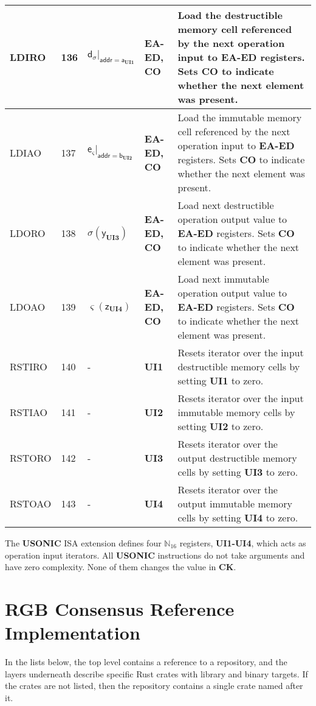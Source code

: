 \documentclass[9pt,oneside]{amsart}
\begin{document}
\begin{table}[h]
\begin{tabular}{l p{1cm} l p{1.5cm} p{9.3cm}}
LDIRO	&136	&$\mathsf{d}_\sigma|_{\mathsf{addr} = \mathsf{a}_\mathbf{UI1}}$	&\textbf{EA-ED, CO}	&Load the destructible memory cell referenced by the next operation input to \textbf{EA-ED} registers. Sets \textbf{CO} to indicate whether the next element was present. \\ \midrule
LDIAO	&137	&$\mathsf{e}_\varsigma|_{\mathsf{addr} = \mathsf{b}_\mathbf{UI2}}$	&\textbf{EA-ED, CO}	&Load the immutable memory cell referenced by the next operation input to \textbf{EA-ED} registers. Sets \textbf{CO} to indicate whether the next element was present. \\ \midrule
LDORO	&138	&$\sigma(\mathsf{y}_\mathbf{UI3})$	&\textbf{EA-ED, CO}	&Load next destructible operation output value to \textbf{EA-ED} registers. Sets \textbf{CO} to indicate whether the next element was present. \\ \midrule
LDOAO	&139	&$\varsigma(\mathsf{z}_\mathbf{UI4})$	&\textbf{EA-ED, CO}	&Load next immutable operation output value to \textbf{EA-ED} registers. Sets \textbf{CO} to indicate whether the next element was present. \\ \midrule
RSTIRO	&140	&-	&\textbf{UI1}	&Resets iterator over the input destructible memory cells by setting \textbf{UI1} to zero. \\ \midrule
RSTIAO	&141	&-	&\textbf{UI2}	&Resets iterator over the input immutable memory cells by setting \textbf{UI2} to zero. \\ \midrule
RSTORO	&142	&-	&\textbf{UI3}	&Resets iterator over the output destructible memory cells by setting \textbf{UI3} to zero. \\ \midrule
RSTOAO	&143	&-	&\textbf{UI4}	&Resets iterator over the output immutable memory cells by setting \textbf{UI4} to zero. \\
\bottomrule
\end{tabular}
\end{table}

The \textbf{USONIC} ISA extension defines four $\mathbb{N}_{16}$ registers,
\textbf{UI1-UI4}, which acts as operation input iterators.
All \textbf{USONIC} instructions do not take arguments and have zero complexity.
None of them changes the value in \textbf{CK}.


\newpage
\section{RGB Consensus Reference Implementation}\label{ap:impl}

In the lists below, the top level contains a reference to a repository,
and the layers underneath describe specific Rust crates with library and binary targets.
If the crates are not listed, then the repository contains a single crate named after it.
\end{document}

